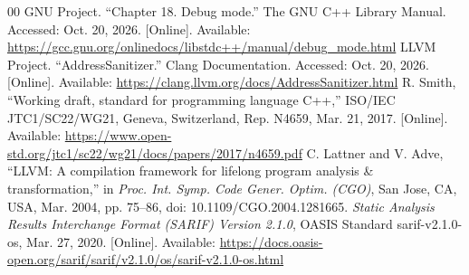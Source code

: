 \documentclass[conference]{IEEEtran}
\begin{document}
\begin{thebibliography}{00}
 GNU Project. ``Chapter 18. Debug mode.'' The GNU C++ Library Manual. Accessed: Oct. 20, 2026. [Online]. Available: \url{https://gcc.gnu.org/onlinedocs/libstdc++/manual/debug_mode.html}
 LLVM Project. ``AddressSanitizer.'' Clang Documentation. Accessed: Oct. 20, 2026. [Online]. Available: \url{https://clang.llvm.org/docs/AddressSanitizer.html}
 R. Smith, ``Working draft, standard for programming language C++,'' ISO/IEC JTC1/SC22/WG21, Geneva, Switzerland, Rep. N4659, Mar. 21, 2017. [Online]. Available: \url{https://www.open-std.org/jtc1/sc22/wg21/docs/papers/2017/n4659.pdf}
 C. Lattner and V. Adve, ``LLVM: A compilation framework for lifelong program analysis \& transformation,'' in \textit{Proc. Int. Symp. Code Gener. Optim. (CGO)}, San Jose, CA, USA, Mar. 2004, pp. 75--86, doi: 10.1109/CGO.2004.1281665.
 \textit{Static Analysis Results Interchange Format (SARIF) Version 2.1.0}, OASIS Standard sarif-v2.1.0-os, Mar. 27, 2020. [Online]. Available: \url{https://docs.oasis-open.org/sarif/sarif/v2.1.0/os/sarif-v2.1.0-os.html}
\end{thebibliography}
\end{document}
